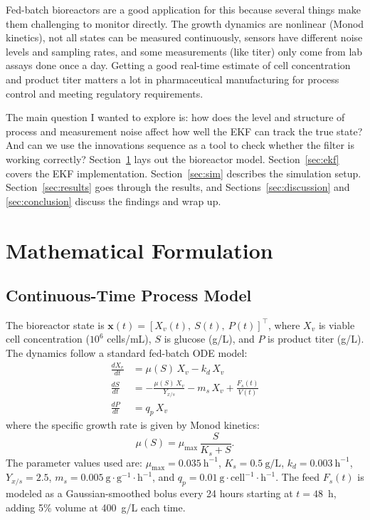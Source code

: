 \documentclass[11pt,letterpaper]{article}
\newcommand{\xv}{X_{v}}
\newcommand{\mumax}{\mu_{\max}}
\newcommand{\Ks}{K_{s}}
\newcommand{\kd}{k_{d}}
\newcommand{\Yxs}{Y_{x/s}}
\newcommand{\ms}{m_{s}}
\newcommand{\qp}{q_{p}}
\newcommand{\Fs}{F_{s}}
\newcommand{\bx}{\mathbf{x}}
\begin{document}
Fed-batch bioreactors are a good application for this because several things make them
challenging to monitor directly. The growth dynamics are nonlinear (Monod kinetics), not all
states can be measured continuously, sensors have different noise levels and sampling rates,
and some measurements (like titer) only come from lab assays done once a day. Getting a
good real-time estimate of cell concentration and product titer matters a lot in pharmaceutical
manufacturing for process control and meeting regulatory requirements.

The main question I wanted to explore is: how does the level and structure of process and
measurement noise affect how well the EKF can track the true state? And can we use the
innovations sequence as a tool to check whether the filter is working correctly? Section~\ref{sec:model}
lays out the bioreactor model. Section~\ref{sec:ekf} covers the EKF implementation.
Section~\ref{sec:sim} describes the simulation setup. Section~\ref{sec:results} goes through
the results, and Sections~\ref{sec:discussion} and \ref{sec:conclusion} discuss the findings
and wrap up.

\section{Mathematical Formulation}
\label{sec:model}

\subsection{Continuous-Time Process Model}

The bioreactor state is $\bx(t) = [\xv(t),\ S(t),\ P(t)]^\top$, where $\xv$ is viable cell
concentration ($10^6$ cells/mL), $S$ is glucose (g/L), and $P$ is product titer (g/L).
The dynamics follow a standard fed-batch ODE model:
\begin{align}
    \frac{d\xv}{dt} &= \mu(S)\,\xv - \kd\,\xv \label{eq:xv}\\[4pt]
    \frac{dS}{dt}   &= -\frac{\mu(S)\,\xv}{\Yxs} - \ms\,\xv + \frac{\Fs(t)}{V(t)}
                       \label{eq:S}\\[4pt]
    \frac{dP}{dt}   &= \qp\,\xv \label{eq:P}
\end{align}
where the specific growth rate is given by Monod kinetics:
\begin{equation}
    \mu(S) = \mumax\,\frac{S}{\Ks + S}.
    \label{eq:monod}
\end{equation}
The parameter values used are: $\mumax = 0.035\ \text{h}^{-1}$, $\Ks = 0.5\ \text{g/L}$,
$\kd = 0.003\ \text{h}^{-1}$, $\Yxs = 2.5$, $\ms = 0.005\ \text{g}{\cdot}\text{g}^{-1}{\cdot}\text{h}^{-1}$,
and $\qp = 0.01\ \text{g}{\cdot}\text{cell}^{-1}{\cdot}\text{h}^{-1}$.
The feed $\Fs(t)$ is modeled as a Gaussian-smoothed bolus every 24 hours starting at $t = 48$~h,
adding 5\% volume at 400~g/L each time.
\end{document}
